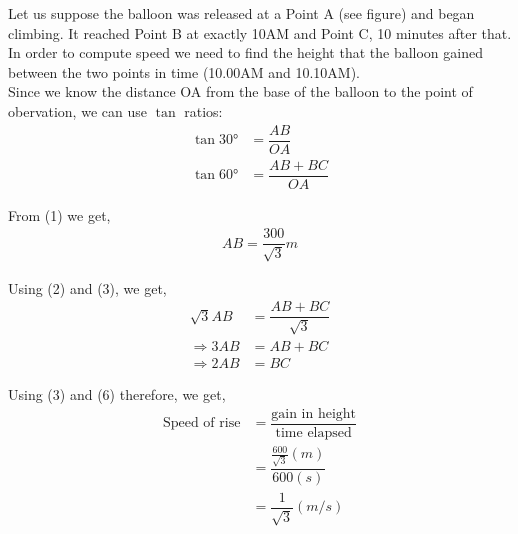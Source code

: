 \begin{solution}[\fullpage]
	Let us suppose the balloon was released at a Point A (see figure) and began climbing. It reached Point B at exactly 10AM and Point C, 10 minutes after that. In order to compute speed we need to find the height that the balloon gained between the two points in time (10.00AM and 10.10AM). \\
	Since we know the distance OA from the base of the balloon to the point of obervation, we can use $\tan$ ratios:
	\begin{align}
		\tan\ang{30} &= \dfrac{AB}{OA}	\\		
		\tan\ang{60} &= \dfrac{AB+BC}{OA}
	\end{align}
	
	From (1) we get,
	\begin{align}
		AB = \dfrac{300}{\sqrt{3}} m
	\end{align}	
	
	Using (2) and (3), we get,
	\begin{align}
		\sqrt{3}AB &= \dfrac{AB+BC}{\sqrt{3}}	\\		
		\Rightarrow 3AB &= AB+BC				\\
		\Rightarrow 2AB &= BC
	\end{align}

	Using (3) and (6) therefore, we get,
	\begin{align}
		\text{Speed of rise} &= \dfrac{\text{gain in height}}{\text{time elapsed}} \\
							 &= \dfrac{\frac{600}{\sqrt{3}}(m)}{600(s)}	\\
							 &= \dfrac{1}{\sqrt{3}}(m/s)
	\end{align}	
		
\end{solution}
